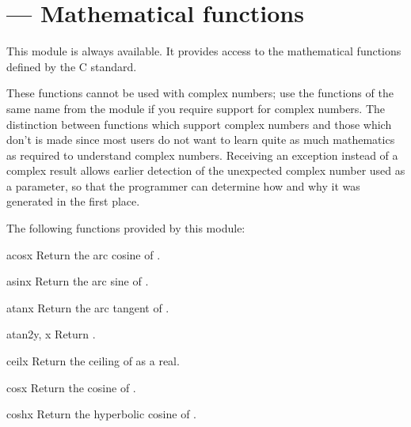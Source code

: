 \section{ ---
         Mathematical functions}


This module is always available.  It provides access to the
mathematical functions defined by the C standard.

These functions cannot be used with complex numbers; use the functions
of the same name from the  module if you require
support for complex numbers.  The distinction between functions which
support complex numbers and those which don't is made since most users
do not want to learn quite as much mathematics as required to
understand complex numbers.  Receiving an exception instead of a
complex result allows earlier detection of the unexpected complex
number used as a parameter, so that the programmer can determine how
and why it was generated in the first place.

The following functions provided by this module:

\begin{funcdesc}{acos}{x}
Return the arc cosine of .
\end{funcdesc}

\begin{funcdesc}{asin}{x}
Return the arc sine of .
\end{funcdesc}

\begin{funcdesc}{atan}{x}
Return the arc tangent of .
\end{funcdesc}

\begin{funcdesc}{atan2}{y, x}
Return .
\end{funcdesc}

\begin{funcdesc}{ceil}{x}
Return the ceiling of  as a real.
\end{funcdesc}

\begin{funcdesc}{cos}{x}
Return the cosine of .
\end{funcdesc}

\begin{funcdesc}{cosh}{x}
Return the hyperbolic cosine of .
\end{funcdesc}

